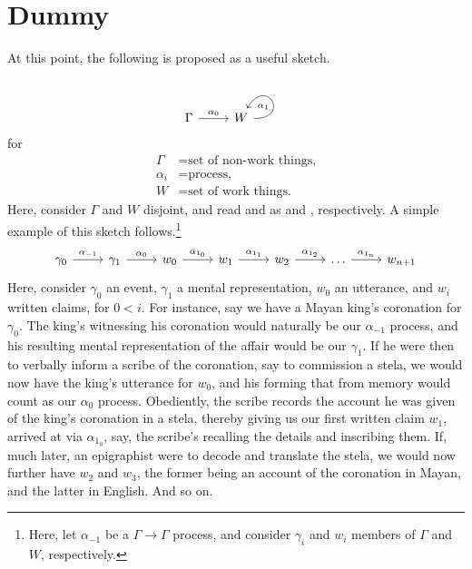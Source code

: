 \section{Dummy}
\label{s:dummy}
\lipsum[5][1-3]

At this point, the following is proposed as a useful sketch.
\[
\begin{tikzcd}
\Gamma\ar[r,"\alpha_0"] & W\ar[in=60,out=0,loop,"\alpha_1"]
\end{tikzcd}
\]
for
\begin{align*}
\Gamma &= \text{set of non-work things,}\\%
\alpha_i &= \text{process,}\\
W &= \text{set of work things.}
\end{align*}
Here, consider \(\Gamma\) and \(W\) disjoint, and read  and  as  and , respectively. A simple example of this sketch follows.\footnote{Here, let \(\alpha_{-1}\) be a \(\Gamma\to\Gamma\) process, and consider \(\gamma_i\) and \(w_i\) members of \(\Gamma\) and \(W\), respectively.}
\[
\begin{tikzcd}
\gamma_0\ar[r,"\alpha_{-1}"] & \gamma_1\ar[r,"\alpha_0"] & w_0\ar[r,"\alpha_{1_0}"] & w_1\ar[r,"\alpha_{1_1}"] & w_2\ar[r,"\alpha_{1_2}"] & \ldots\ar[r,"\alpha_{1_n}"] & w_{n+1}
\end{tikzcd}
\]
Here, consider \(\gamma_0\) an event, \(\gamma_1\) a mental representation, \(w_0\) an utterance, and \(w_i\) written claims, for \(0<i\). For instance, say we have a Mayan king's coronation for \(\gamma_0\). The king's witnessing his coronation would naturally be our \(\alpha_{-1}\) process, and his resulting mental representation of the affair would be our \(\gamma_1\). If he were then to verbally inform a scribe of the coronation, say to commission a stela, we would now have the king's utterance for \(w_0\), and his forming that from memory would count as our \(\alpha_0\) process. Obediently, the scribe records the account he was given of the king's coronation in a stela, thereby giving us our first written claim \(w_1\), arrived at via \(\alpha_{1_0}\), say, the scribe's recalling the details and inscribing them. If, much later, an epigraphist were to decode and translate the stela, we would now further have \(w_2\) and \(w_3\), the former being an account of the coronation in Mayan, and the latter in English. And so on.